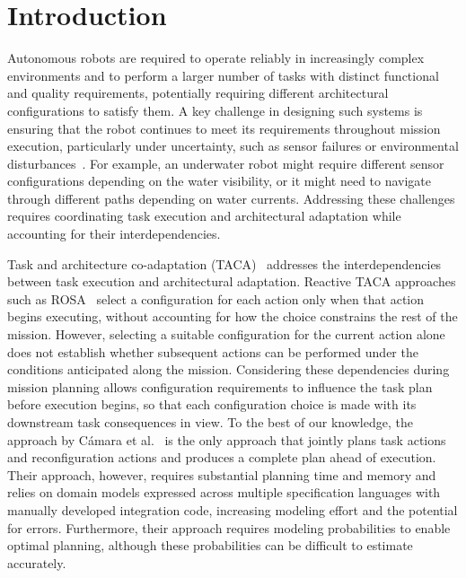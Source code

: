 \section{Introduction}

Autonomous robots are required to operate reliably in increasingly complex environments and to perform a larger number of tasks with distinct functional and quality requirements, potentially requiring different architectural configurations to satisfy them. A key challenge in designing such systems is ensuring that the robot continues to meet its requirements throughout mission execution, particularly under uncertainty, such as sensor failures or environmental disturbances~\cite{Correll-2017, Krotkov-2018}. For example, an underwater robot might require different sensor configurations depending on the water visibility, or it might need to navigate through different paths depending on water currents. Addressing these challenges requires coordinating task execution and architectural adaptation while accounting for their interdependencies.

Task and architecture co-adaptation (TACA)~\cite{CAMARASoftwareArchitectureTask2020} addresses the interdependencies between task execution and architectural adaptation. Reactive TACA approaches such as ROSA~\cite{rosa} select a configuration for each action only when that action begins executing, without accounting for how the choice constrains the rest of the mission. However, selecting a suitable configuration for the current action alone does not establish whether subsequent actions can be performed under the conditions anticipated along the mission. Considering these dependencies during mission planning allows configuration requirements to influence the task plan before execution begins, so that each configuration choice is made with its downstream task consequences in view. To the best of our knowledge, the approach by Cámara et al.~\cite{CAMARASoftwareArchitectureTask2020} is the only approach that jointly plans task actions and reconfiguration actions and produces a complete plan ahead of execution. Their approach, however, requires substantial planning time and memory and relies on domain models expressed across multiple specification languages with manually developed integration code, increasing modeling effort and the potential for errors. Furthermore, their approach requires modeling probabilities to enable optimal planning, although these probabilities can be difficult to estimate accurately.

